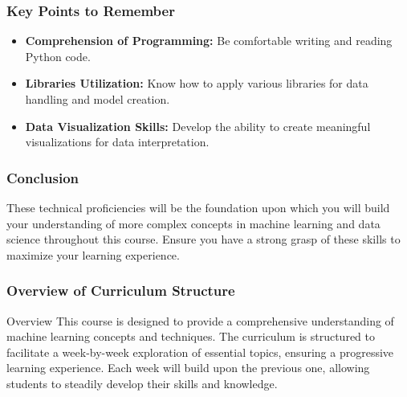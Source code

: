 \documentclass[aspectratio=169]{beamer}
\begin{document}
\begin{frame}
    \frametitle{Key Points to Remember}
    \begin{itemize}
        \item \textbf{Comprehension of Programming:} Be comfortable writing and reading Python code.
        \item \textbf{Libraries Utilization:} Know how to apply various libraries for data handling and model creation.
        \item \textbf{Data Visualization Skills:} Develop the ability to create meaningful visualizations for data interpretation.
    \end{itemize}
\end{frame}

\begin{frame}
    \frametitle{Conclusion}
    These technical proficiencies will be the foundation upon which you will build your understanding of more complex concepts in machine learning and data science throughout this course. 
    Ensure you have a strong grasp of these skills to maximize your learning experience.
\end{frame}

\begin{frame}
    \titlepage
\end{frame}

\begin{frame}
    \frametitle{Overview of Curriculum Structure}
    \begin{block}{Overview}
        This course is designed to provide a comprehensive understanding of machine learning concepts and techniques. 
        The curriculum is structured to facilitate a week-by-week exploration of essential topics, ensuring a progressive 
        learning experience. Each week will build upon the previous one, allowing students to steadily develop 
        their skills and knowledge.
    \end{block}
\end{frame}
\end{document}
